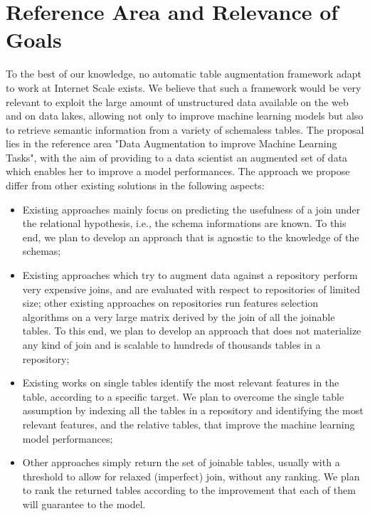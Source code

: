 \section{Reference Area and Relevance of Goals}\label{reference}
To the best of our knowledge, no automatic table augmentation framework adapt to work at Internet Scale exists. We believe that such a framework would be very relevant to exploit the large amount of unstructured data available on the web and on data lakes, allowing not only to improve machine learning models but also to retrieve semantic information from a variety of schemaless tables.
The proposal lies in the reference area "Data Augmentation to improve Machine Learning Tasks", with the aim of providing to a data scientist an augmented set of data which enables her to improve a model performances. The approach we propose differ from other existing solutions in the following aspects:
\begin{itemize}
    \item Existing approaches mainly focus on predicting the usefulness of a join under the relational hypothesis, i.e., the schema informations are known. To this end, we plan to develop an approach that is agnostic to the knowledge of the schemas;
    \item Existing approaches which try to augment data against a repository perform very expensive joins, and are evaluated with respect to repositories of limited size; other existing approaches on repositories run features selection algorithms on a very large matrix derived by the join of all the joinable tables. To this end, we plan to develop an approach that does not materialize any kind of join and is scalable to hundreds of thousands tables in a repository;
    \item Existing works on single tables identify the most relevant features in the table, according to a specific target. We plan to overcome the single table assumption by indexing all the tables in a repository and identifying the most relevant features, and the relative tables, that improve the machine learning model performances;
    \item Other approaches simply return the set of joinable tables, usually with a threshold to allow for relaxed  (imperfect) join, without any ranking. We plan to rank the returned tables according to the improvement that each of them will guarantee to the model.
\end{itemize}    